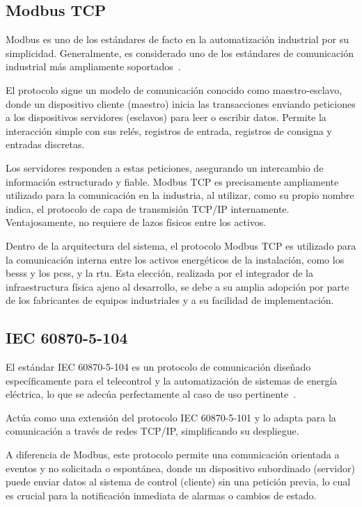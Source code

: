 \subsection{Modbus TCP}
\label{makereference3.3.1}

Modbus es uno de los estándares de facto en la automatización industrial por su simplicidad. Generalmente, es considerado uno de los estándares de comunicación industrial más ampliamente soportados~\cite{swales1999open}.

El protocolo sigue un modelo de comunicación conocido como maestro-esclavo, donde un dispositivo cliente (maestro) inicia las transacciones enviando peticiones a los dispositivos servidores (esclavos) para leer o escribir datos. Permite la interacción simple con sus relés, registros de entrada, registros de consigna y entradas discretas.

Los servidores responden a estas peticiones, asegurando un intercambio de información estructurado y fiable. Modbus TCP es precisamente ampliamente utilizado para la comunicación en la industria, al utilizar, como su propio nombre indica, el protocolo de capa de transmisión TCP/IP internamente. Ventajosamente, no requiere de lazos físicos entre los activos.

Dentro de la arquitectura del sistema, el protocolo Modbus TCP es utilizado para la comunicación interna entre los activos energéticos de la instalación, como los \glspl{bess} y los \glspl{pcs}, y la \gls{rtu}. Esta elección, realizada por el integrador de la infraestructura física ajeno al desarrollo, se debe a su amplia adopción por parte de los fabricantes de equipos industriales y a su facilidad de implementación.

\subsection{IEC 60870-5-104}
\label{makereference3.3.2}

El estándar IEC 60870-5-104 es un protocolo de comunicación diseñado específicamente para el telecontrol y la automatización de sistemas de energía eléctrica, lo que se adecúa perfectamente al caso de uso pertinente~\cite{iec2016telecontrol}.

Actúa como una extensión del protocolo IEC 60870-5-101 y lo adapta para la comunicación a través de redes TCP/IP, simplificando su despliegue.

A diferencia de Modbus, este protocolo permite una comunicación orientada a eventos y no solicitada o espontánea, donde un dispositivo subordinado (servidor) puede enviar datos al sistema de control (cliente) sin una petición previa, lo cual es crucial para la notificación inmediata de alarmas o cambios de estado.

